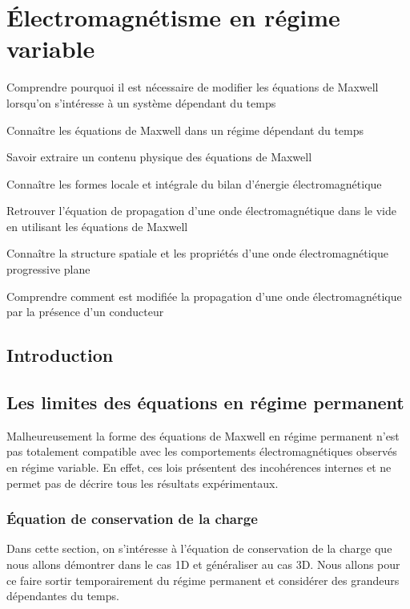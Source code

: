 \chapter{Électromagnétisme en régime variable}
\label{chap:maxwell}
\begin{objectif}
	\item Comprendre pourquoi il est nécessaire de modifier les équations 
	  de Maxwell lorsqu'on s'intéresse à un système dépendant du temps
	\item Connaître les équations de Maxwell dans un régime dépendant du temps 
	\item Savoir extraire un contenu physique des équations de Maxwell
	\item Connaître les formes locale et intégrale du bilan d'énergie
	  électromagnétique
	\item Retrouver l'équation de propagation d'une onde électromagnétique
	  dans le vide en utilisant les équations de Maxwell
	\item Connaître la structure spatiale et les propriétés d'une
	  onde électromagnétique progressive plane
	\item Comprendre comment est modifiée la propagation d'une onde 
	  électromagnétique par la présence d'un conducteur
\end{objectif}

\section*{Introduction}

\section{Les limites des équations en régime permanent}
Malheureusement la forme des équations de Maxwell en régime permanent n'est pas
totalement compatible avec les comportements électromagnétiques observés en régime 
variable. En effet, ces lois présentent des incohérences internes et ne permet
pas de décrire tous les résultats expérimentaux.

\subsection{Équation de conservation de la charge}
Dans cette section, on s'intéresse à l'équation de conservation de la charge
que nous allons démontrer dans le cas 1D et généraliser au cas 3D. Nous allons
pour ce faire sortir temporairement du régime permanent et considérer des
grandeurs dépendantes du temps.

